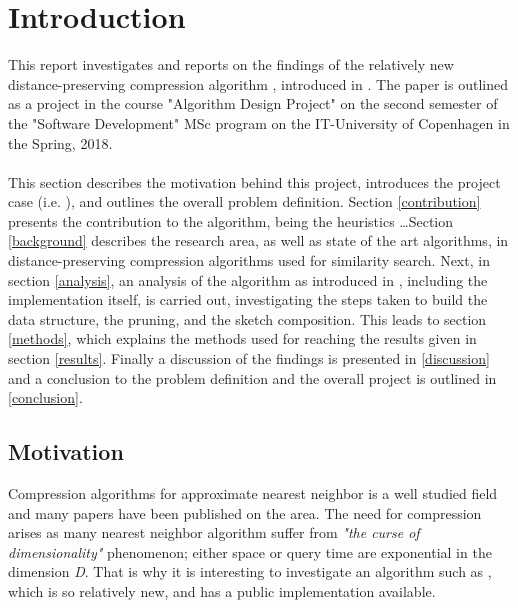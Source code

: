 \section{Introduction}
\label{introduction}
This report investigates and reports on the findings of the relatively new distance-preserving compression algorithm \qs{}, introduced in \cite{wagner17}. The paper is outlined as a project in the course "Algorithm Design Project" on the second semester of the "Software Development" MSc program on the IT-University of Copenhagen in the Spring, 2018.
\\
\\
This section describes the motivation behind this project, introduces the project case (i.e. \qs{}), and outlines the overall problem definition. Section \ref{contribution} presents the contribution to the algorithm, being the heuristics \dots Section \ref{background} describes the research area, as well as state of the art algorithms, in distance-preserving compression algorithms used for similarity search. Next, in section \ref{analysis}, an analysis of the algorithm as introduced in \cite{wagner17}, including the \qs{} implementation itself, is carried out, investigating the steps taken to build the data structure, the pruning, and the sketch composition. This leads to section \ref{methods}, which explains the methods used for reaching the results given in section \ref{results}. Finally a discussion of the findings is presented in \ref{discussion} and a conclusion to the problem definition and the overall project is outlined in \ref{conclusion}.

\subsection{Motivation} %
Compression algorithms for approximate nearest neighbor is a well studied field and many papers have been published on the area. The need for compression arises as many nearest neighbor algorithm suffer from \textit{"the curse of dimensionality"} phenomenon; either space or query time are exponential in the dimension \textit{D}\cite{ilya15}. That is why it is interesting to investigate an algorithm such as \qs{}, which is so relatively new, and has a public implementation available. %
